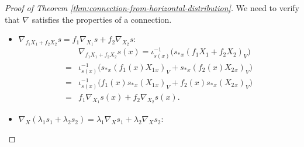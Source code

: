 \begin{proof}[Proof of Theorem \ref{thm:connection-from-horizontal-distribution}]
    We need to verify that $\nabla$ satisfies the properties of a connection. 
    \begin{itemize}
        \item $\nabla_{f_1X_1 + f_2X_2} s = f_1 \nabla_{X_1} s + f_2 \nabla_{X_2} s$:
        \begin{align*}
            &\nabla_{f_1X_1 + f_2X_2} s(x) = \iota_{s(x)}^{-1}\Big(s_*{}_x(f_1X_1 + f_2X_2)_V\Big) \\
            =& \iota_{s(x)}^{-1}\Big(s_*{}_x(f_1(x)X_1{}_x)_V + s_*{}_x(f_2(x)X_2{}_x)_V\Big) \\
            =& \iota_{s(x)}^{-1}\Big(f_1(x) s_*{}_x(X_1{}_x)_V + f_2(x) s_*{}_x(X_2{}_x)_V\Big) \\
            =& f_1 \nabla_{X_1} s(x) + f_2 \nabla_{X_2} s(x).
        \end{align*}
        \item $\nabla_X (\lambda_1 s_1 + \lambda_2 s_2) = \lambda_1 \nabla_X s_1 + \lambda_2 \nabla_X s_2$:
        

\end{itemize}
\end{proof}
